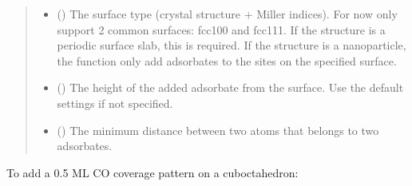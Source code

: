 \documentclass[letterpaper,10pt,english]{sphinxmanual}
\begin{document}
\begin{fulllineitems}
\begin{quote}
\begin{description}
\begin{itemize}
\item {} 
 (\sphinxstyleliteralemphasis{\sphinxupquote{, }}) \textendash{} The surface type (crystal structure + Miller indices).
For now only support 2 common surfaces: fcc100 and fcc111.
If the structure is a periodic surface slab, this is required.
If the structure is a nanoparticle, the function only add
adsorbates to the sites on the specified surface.

\item {} 
 (\sphinxstyleliteralemphasis{\sphinxupquote{, }}) \textendash{} The height of the added adsorbate from the surface.
Use the default settings if not specified.

\item {} 
 (\sphinxstyleliteralemphasis{\sphinxupquote{, }}) \textendash{} The minimum distance between two atoms that belongs to two
adsorbates.

\end{itemize}

\end{description}\end{quote}

\end{fulllineitems}



To add a 0.5 ML CO coverage pattern on a cuboctahedron:
\end{document}
